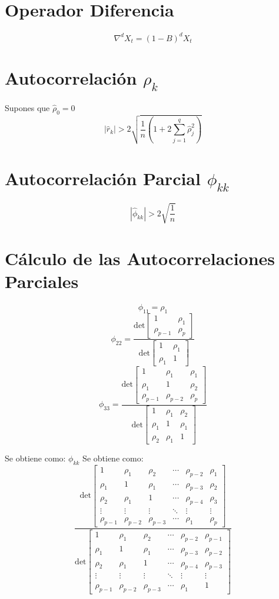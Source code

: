 \documentclass[12pt]{article} %
\begin{document}
\begin{multicols}{3}
\section*{Operador Diferencia}
\[
\nabla^d X_t =(1-B)^d X_t 
\]
\section*{Autocorrelación \(\rho_k\)}
Supones que $\hat{\rho}_0=0$
\[
|\hat{r}_k| > 2 \sqrt{ \frac{1}{n} \left( 1 + 2 \sum_{j=1}^{q} \hat{\rho}_j^2 \right) }
\]
\section*{Autocorrelación Parcial \(\phi_{kk}\)}
\[
|\hat{\phi}_{kk}| > 2 \sqrt{ \frac{1}{n} }
\]
\section*{Cálculo de las Autocorrelaciones Parciales}
\[
\phi_{11} = \rho_1
\]
\[
\phi_{22}=
\frac{
\text{det}\begin{bmatrix}
1  & \rho_{1} \\
\rho_{p-1} & \rho_p
\end{bmatrix}
}{
\text{det}\begin{bmatrix}
1 & \rho_1 \\
\rho_1 & 1 
\end{bmatrix}
}
\]
\[
\phi_{33}=
\frac{
\text{det}\begin{bmatrix}
1 & \rho_1  & \rho_{1} \\
\rho_1 & 1  & \rho_{2} \\
\rho_{p-1} & \rho_{p-2} & \rho_p
\end{bmatrix}
}{
\text{det}\begin{bmatrix}
1 & \rho_1 & \rho_2 \\
\rho_1 & 1 & \rho_1 \\
\rho_2 & \rho_1 & 1 
\end{bmatrix}
}
\]

 
 Se obtiene como:
 $\phi_{kk}$ Se obtiene como:
\[
\frac{
\text{det}\begin{bmatrix}
1 & \rho_1 & \rho_2 & \cdots & \rho_{p-2} & \rho_{1} \\
\rho_1 & 1 & \rho_1 & \cdots & \rho_{p-3} & \rho_{2} \\
\rho_2 & \rho_1 & 1 & \cdots & \rho_{p-4} & \rho_{3} \\
\vdots & \vdots & \vdots & \ddots & \vdots & \vdots \\
\rho_{p-1} & \rho_{p-2} & \rho_{p-3} & \cdots & \rho_1 & \rho_p
\end{bmatrix}
}{
\text{det}\begin{bmatrix}
1 & \rho_1 & \rho_2 & \cdots & \rho_{p-2}& \rho_{p-1} \\
\rho_1 & 1 & \rho_1 & \cdots & \rho_{p-3} & \rho_{p-2}\\
\rho_2 & \rho_1 & 1 & \cdots & \rho_{p-4} & \rho_{p-3}\\
\vdots & \vdots & \vdots & \ddots & \vdots & \vdots\\
\rho_{p-1} & \rho_{p-2} & \rho_{p-3} & \cdots & \rho_{1} & 1 
\end{bmatrix}
}
\]


\end{multicols}
\end{document}
